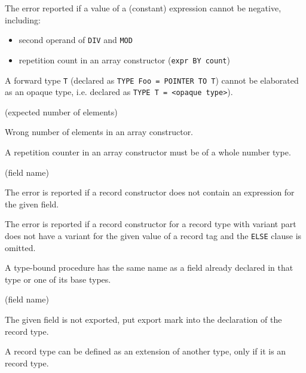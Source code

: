 The error reported if a value of a (constant) expression cannot be
negative, including:
\begin{itemize}
\item second operand of \verb'DIV' and \verb'MOD'
\item repetition count in an array constructor (\verb'expr BY count')
\end{itemize}


A forward type \verb'T' (declared as \verb'TYPE Foo = POINTER TO T') cannot be
elaborated as an opaque type, i.e. declared as \verb'TYPE T = <opaque type>').

(expected number of elements)

Wrong number of elements in an array constructor.


A repetition counter in an array constructor must be of a whole
number type.

(field name)

The error is reported if a record constructor does not contain
an expression for the given field.


The error is reported if a record constructor for a record type
with variant part does not have a variant for the given value of a
record tag and the \verb'ELSE' clause is omitted.


A type-bound procedure has the same name as a field
already declared in that type or one of its base types.

(field name)

The given field is not exported, put export mark into the declaration
of the record type.

%


A record type can be defined as an extension of another type, only
if it is an \ot{} record type.

